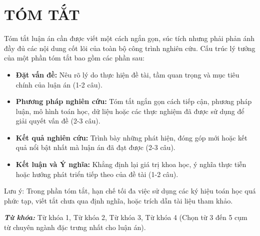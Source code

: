 \chapter*{TÓM TẮT}
\vspace{-40pt}

Tóm tắt luận án cần được viết một cách ngắn gọn, súc tích nhưng phải phản ánh đầy đủ các nội dung cốt lõi của toàn bộ công trình nghiên cứu. Cấu trúc lý tưởng của một phần tóm tắt bao gồm các phần sau:

\begin{itemize}
    \item \textbf{Đặt vấn đề:} Nêu rõ lý do thực hiện đề tài, tầm quan trọng và mục tiêu chính của luận án (1-2 câu).
    \item \textbf{Phương pháp nghiên cứu:} Tóm tắt ngắn gọn cách tiếp cận, phương pháp luận, mô hình toán học, dữ liệu hoặc các thực nghiệm đã được sử dụng để giải quyết vấn đề (2-3 câu).
    \item \textbf{Kết quả nghiên cứu:} Trình bày những phát hiện, đóng góp mới hoặc kết quả nổi bật nhất mà luận án đã đạt được (2-3 câu).
    \item \textbf{Kết luận và Ý nghĩa:} Khẳng định lại giá trị khoa học, ý nghĩa thực tiễn hoặc hướng phát triển tiếp theo của đề tài (1-2 câu).
\end{itemize}

Lưu ý: Trong phần tóm tắt, hạn chế tối đa việc sử dụng các ký hiệu toán học quá phức tạp, viết tắt chưa qua định nghĩa, hoặc trích dẫn tài liệu tham khảo.

\vspace{15pt}
\noindent \textbf{\textit{Từ khóa:}} Từ khóa 1, Từ khóa 2, Từ khóa 3, Từ khóa 4 (Chọn từ 3 đến 5 cụm từ chuyên ngành đặc trưng nhất cho luận án).


